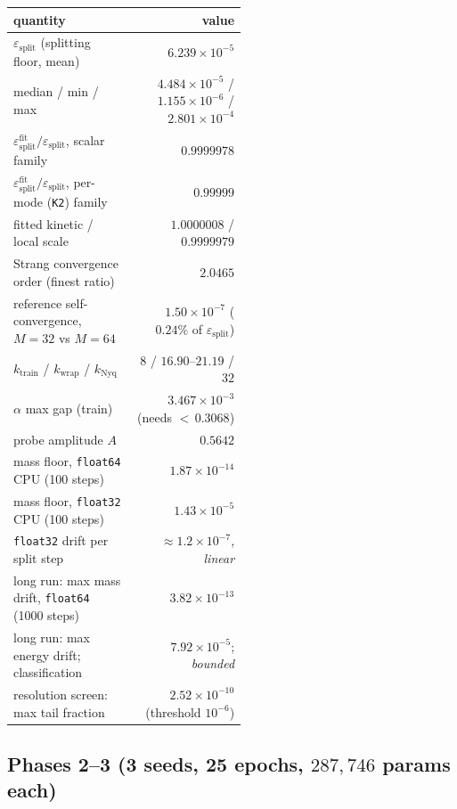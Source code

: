 \documentclass[11pt,a4paper]{article}
\theoremstyle{plain}
\theoremstyle{definition}
\theoremstyle{remark}
\newcommand{\kwrap}{k_{\mathrm{wrap}}}
\newcommand{\ktrain}{k_{\mathrm{train}}}
\newcommand{\knyq}{k_{\mathrm{Nyq}}}
\newcommand{\epssplit}{\varepsilon_{\mathrm{split}}}
\newcommand{\code}[1]{\texttt{\small #1}}
\begin{document}
\begin{center}
\begin{tabular}{@{}p{0.52\linewidth}r@{}}
\toprule
\textbf{quantity} & \textbf{value}\\
\midrule
$\epssplit$ (splitting floor, mean) & $6.239\times10^{-5}$\\
\hspace{1em} median / min / max & $4.484\times10^{-5}$ / $1.155\times10^{-6}$ / $2.801\times10^{-4}$\\
$\epssplit^{\mathrm{fit}}/\epssplit$, scalar family & $0.9999978$\\
$\epssplit^{\mathrm{fit}}/\epssplit$, per-mode (\code{K2}) family & $0.99999$\\
fitted kinetic / local scale & $1.0000008$ / $0.9999979$\\
Strang convergence order (finest ratio) & $2.0465$\\
reference self-convergence, $M{=}32$ vs $M{=}64$ & $1.50\times10^{-7}$ ($0.24\%$ of $\epssplit$)\\
\midrule
$\ktrain$ / $\kwrap$ / $\knyq$ & $8$ / $16.90$--$21.19$ / $32$\\
$\alpha$ max gap (train) & $3.467\times10^{-3}$ \; (needs ${<}\,0.3068$)\\
probe amplitude $A$ & $0.5642$\\
\midrule
mass floor, \code{float64} CPU (100 steps) & $1.87\times10^{-14}$\\
mass floor, \code{float32} CPU (100 steps) & $1.43\times10^{-5}$\\
\code{float32} drift per split step & $\approx1.2\times10^{-7}$, \emph{linear}\\
long run: max mass drift, \code{float64} (1000 steps) & $3.82\times10^{-13}$\\
long run: max energy drift; classification & $7.92\times10^{-5}$; \emph{bounded}\\
resolution screen: max tail fraction & $2.52\times10^{-10}$ (threshold $10^{-6}$)\\
\bottomrule
\end{tabular}
\end{center}

\subsection*{Phases 2--3 (3 seeds, 25 epochs, $287{,}746$ params each)}
\end{document}
